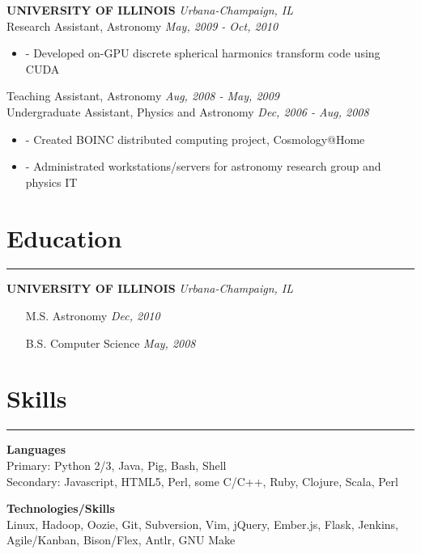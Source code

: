 \documentclass[a4paper,11pt]{article}
\newenvironment{pitemize}{
\begin{itemize}
\setlength{\itemsep}{.01in}
\setlength{\parskip}{.01in}
}
{\end{itemize}}
\begin{document}
\vspace{0.2in}
\textbf{UNIVERSITY OF ILLINOIS} \hfill \textit{Urbana-Champaign, IL} \\
Research Assistant, Astronomy \hfill \textit{May, 2009 - Oct, 2010}
\begin{pitemize}
\item[-]Developed on-GPU discrete spherical harmonics transform code using CUDA
\end{pitemize}
Teaching Assistant, Astronomy \hfill \textit{Aug, 2008 - May, 2009} \\
Undergraduate Assistant, Physics and Astronomy \hfill \textit{Dec, 2006 - Aug, 2008}
\begin{pitemize}
\item[-]Created BOINC distributed computing project, Cosmology@Home
\item[-]Administrated workstations/servers for astronomy research group and physics IT
\end{pitemize}


\section*{\huge{Education}}
\hrule
\vspace{0.1in}
\textbf{UNIVERSITY OF ILLINOIS} \hfill \textit{Urbana-Champaign, IL}
\begin{itemize}
\setlength{\itemsep}{0.0in}
\item[]M.S. Astronomy \hfill \textit{Dec, 2010}
\item[]B.S. Computer Science \hfill \textit{May, 2008}
\end{itemize}

\section*{\huge{Skills}}
\hrule
\vspace{0.1in}
\textbf{Languages} \\
Primary: Python 2/3, Java, Pig, Bash, Shell \\
Secondary: Javascript, HTML5, Perl, some C/C++, Ruby, Clojure, Scala, Perl

\vspace{0.1in}

\textbf{Technologies/Skills} \\
Linux, Hadoop, Oozie, Git, Subversion, Vim, jQuery, Ember.js, Flask, Jenkins, Agile/Kanban, Bison/Flex, Antlr, GNU Make
\end{document}
